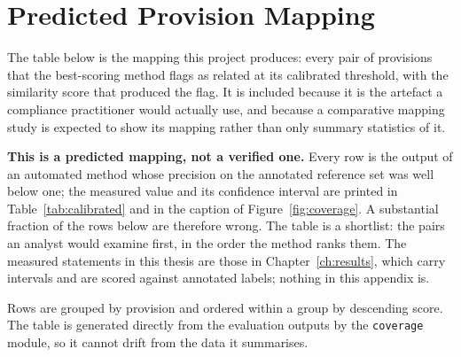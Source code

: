 \chapter{Predicted Provision Mapping}\label{app:mapping}

The table below is the mapping this project produces: every pair of provisions
that the best-scoring method flags as related at its calibrated
threshold, with the similarity score that produced the flag. It is included
because it is the artefact a compliance practitioner would actually use, and
because a comparative mapping study is expected to show its mapping rather than
only summary statistics of it.

\medskip
\noindent\textbf{This is a predicted mapping, not a verified one.} Every row is
the output of an automated method whose precision on the annotated reference set
was well below one; the measured value and its confidence interval are printed
in Table~\ref{tab:calibrated} and in the caption of Figure~\ref{fig:coverage}. A
substantial fraction of the rows below are therefore wrong. The table is a
shortlist: the pairs an analyst would examine first, in the order the method
ranks them. The measured statements in this thesis are those in
Chapter~\ref{ch:results}, which carry intervals and are scored against annotated
labels; nothing in this appendix is.

\medskip
\noindent Rows are grouped by \standardA{} provision and ordered within a group
by descending score. The table is generated directly from the evaluation
outputs by the \texttt{coverage} module, so it cannot drift from the data
it summarises.

\bigskip

